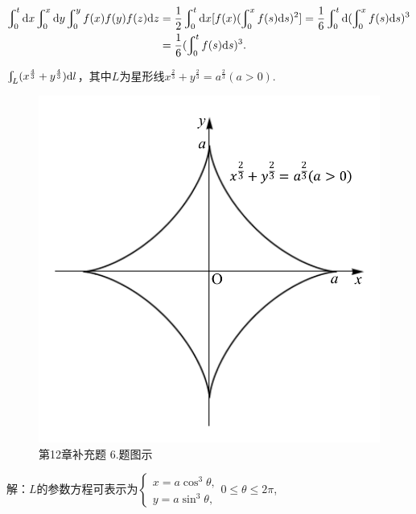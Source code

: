 \documentclass[12pt,UTF8]{ctexart}
\newcommand{\Int}[4]{\varint\nolimits_{#1}^{#2}#3\mathrm d#4}
\newcommand{\LInt}[3]{\varint\nolimits_{#1}#2\mathrm d#3}
\begin{document}
\begin{enumerate}
\[\begin{split}
\Int0t{}x\Int0x{}y\Int0y{f(x)f(y)f(z)}z&=\frac12\Int0t{}x[f(x)(\Int0x{f(s)}s)^2]=\frac16\Int0t{}{(\Int0x{f(s)}s)^3}\\
&=\frac16(\Int0t{f(s)}s)^3.
\end{split}\]

$\LInt L{(x^{\frac43}+y^{\frac43})}l$，其中$L$为星形线$x^{\frac23}+y^{\frac23}=a^{\frac23}(a>0)$.

\begin{figure}[H]
\begin{center}
\includegraphics[height=0.3\textheight]{Figures21/Fig12-C-6.pdf}
\end{center}
\caption{第12章补充题 6.题图示}
\label{12-C-6}
\end{figure}

解：$L$的参数方程可表示为$\begin{cases}
x=a\cos^3\theta,\\
y=a\sin^3\theta,
\end{cases}0\leqslant\theta\leqslant2\pi$,


\end{enumerate}
\end{document}
